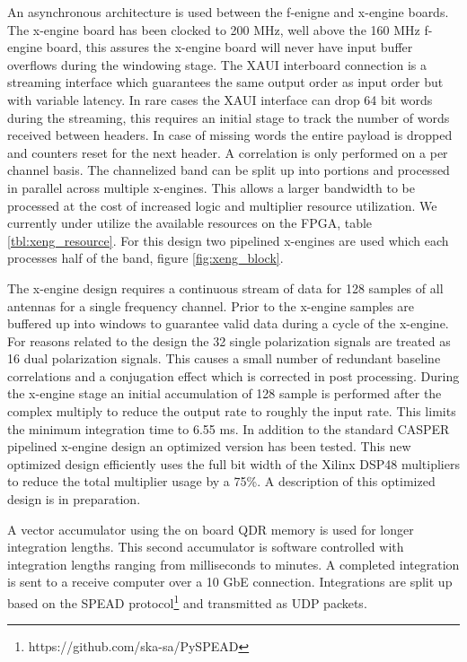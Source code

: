 \documentclass[useAMS,macros,usenatbib,onecolumn]{mn2e}
\begin{document}
An asynchronous architecture is used between the f-enigne and x-engine boards.
The x-engine board has been clocked to 200 MHz, well above the 160 MHz f-engine board, this assures the x-engine board will never have input buffer overflows during the windowing stage.
The XAUI interboard connection is a streaming interface which guarantees the same output order as input order but with variable latency.
In rare cases the XAUI interface can drop 64 bit words during the streaming, this requires an initial stage to track the number of words received between headers.
In case of missing words the entire payload is dropped and counters reset for the next header.
A correlation is only performed on a per channel basis.
The channelized band can be split up into portions and processed in parallel across multiple x-engines.
This allows a larger bandwidth to be processed at the cost of increased logic and multiplier resource utilization.
We currently under utilize the available resources on the FPGA, table \ref{tbl:xeng_resource}.
For this design two pipelined x-engines are used which each processes half of the band, figure \ref{fig:xeng_block}.

The x-engine design requires a continuous stream of data for 128 samples of all antennas for a single frequency channel.
Prior to the x-engine samples are buffered up into windows to guarantee valid data during a cycle of the x-engine.
For reasons related to the design the 32 single polarization signals are treated as 16 dual polarization signals.
This causes a small number of redundant baseline correlations and a conjugation effect which is corrected in post processing.
During the x-engine stage an initial accumulation of 128 sample is performed after the complex multiply to reduce the output rate to roughly the input rate.
This limits the minimum integration time to 6.55 ms.
In addition to the standard CASPER pipelined x-engine design an optimized version has been tested.
This new optimized design efficiently uses the full bit width of the Xilinx DSP48 multipliers to reduce the total multiplier usage by a 75\%.
A description of this optimized design is in preparation.

A vector accumulator using the on board QDR memory is used for longer integration lengths.
This second accumulator is software controlled with integration lengths ranging from milliseconds to minutes.
A completed integration is sent to a receive computer over a 10 GbE connection.
Integrations are split up based on the SPEAD protocol\footnote{https://github.com/ska-sa/PySPEAD} and transmitted as UDP packets.
\end{document}
